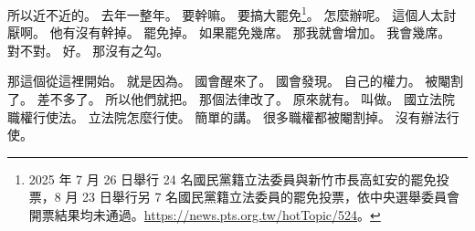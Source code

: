 \hypertarget{c01:cue:1611}{}所以近不近的。
\hypertarget{c01:cue:1612}{}去年一整年。
\hypertarget{c01:cue:1613}{}要幹嘛。
\hypertarget{c01:cue:1614}{}要搞大罷免\footnote{2025 年 7 月 26 日舉行 24 名國民黨籍立法委員與新竹市長高虹安的罷免投票，8 月 23 日舉行另 7 名國民黨籍立法委員的罷免投票，依中央選舉委員會開票結果均未通過。\url{https://news.pts.org.tw/hotTopic/524}。}。
\hypertarget{c01:cue:1615}{}怎麼辦呢。
\hypertarget{c01:cue:1616}{}這個人太討厭啊。
\hypertarget{c01:cue:1617}{}他有沒有幹掉。
\hypertarget{c01:cue:1618}{}罷免掉。
\hypertarget{c01:cue:1619}{}如果罷免幾席。
\hypertarget{c01:cue:1620}{}那我就會增加。
\hypertarget{c01:cue:1621}{}我會幾席。
\hypertarget{c01:cue:1622}{}對不對。
\hypertarget{c01:cue:1623}{}好。
\hypertarget{c01:cue:1624}{}那沒有之勾。

\hypertarget{c01:cue:1625}{}那這個從這裡開始。
\hypertarget{c01:cue:1626}{}就是因為。
\hypertarget{c01:cue:1627}{}國會醒來了。
\hypertarget{c01:cue:1628}{}國會發現。
\hypertarget{c01:cue:1629}{}自己的權力。
\hypertarget{c01:cue:1630}{}被閹割了。
\hypertarget{c01:cue:1631}{}差不多了。
\hypertarget{c01:cue:1632}{}所以他們就把。
\hypertarget{c01:cue:1633}{}那個法律改了。
\hypertarget{c01:cue:1634}{}原來就有。
\hypertarget{c01:cue:1635}{}叫做。
\hypertarget{c01:cue:1636}{}國立法院職權行使法。
\hypertarget{c01:cue:1637}{}立法院怎麼行使。
\hypertarget{c01:cue:1638}{}簡單的講。
\hypertarget{c01:cue:1639}{}很多職權都被閹割掉。
\hypertarget{c01:cue:1640}{}沒有辦法行使。

